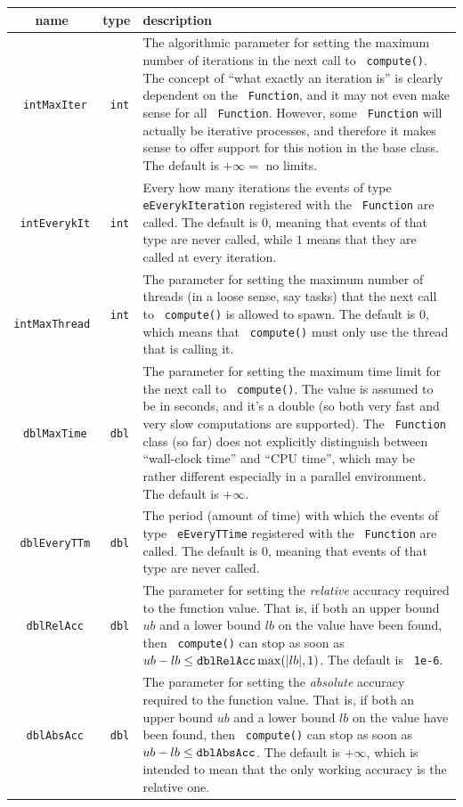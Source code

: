 \documentclass[a4paper]{article}
\newcommand{\code}[1]{\textrm{\texttt{\hyphenchar\font=200 #1}}}
\begin{document}
\begin{longtable}{|c|c|p{13.4cm}|}
 \hline
 name & type & description \\
 \hline
 \code{intMaxIter} & \code{int} & The algorithmic parameter for setting the maximum number of iterations in the next call to \code{compute()}. The concept of ``what exactly an iteration is'' is clearly dependent on the \code{Function}, and it may not even make sense for all \code{Function}. However, some \code{Function} will actually be iterative processes, and therefore it makes sense to offer support for this notion in the base class. The default is $+\infty =$ no limits.\\
 \hline
 \code{intEverykIt} & \code{int} & Every how many iterations the events of type \code{eEverykIteration} registered with the \code{Function} are called. The default is $0$, meaning that events of that type are never called, while $1$ means that they are called at every iteration.\\
 \hline
 \code{intMaxThread} & \code{int} & The parameter for setting the maximum number of threads (in a loose sense, say tasks) that the next call to \code{compute()} is allowed to spawn. The default is $0$, which means that \code{compute()} must only use the thread that is calling it.\\
 \hline
 \code{dblMaxTime} & \code{dbl} & The parameter for setting the maximum time limit for the next call to \code{compute()}. The value is assumed to be in seconds, and it's a double (so both very fast and very slow computations are supported). The \code{Function} class (so far) does not explicitly distinguish between ``wall-clock time'' and ``CPU time'', which may be rather different especially in a parallel environment. The default is $+\infty$.\\
 \hline
 \code{dblEveryTTm} & \code{dbl} & The period (amount of time) with which the events of type \code{eEveryTTime} registered with the \code{Function} are called. The default is $0$, meaning that events of that type are never called.\\
 \hline
 \code{dblRelAcc} & \code{dbl} & The parameter for setting the \emph{relative} accuracy required to the function value. That is, if both an upper bound $ub$ and a lower bound $lb$ on the value have been found, then \code{compute()} can stop as soon as $ub - lb \leq \code{dblRelAcc} \max( |lb| , 1 )$. The default is \code{1e-6}.\\
 \hline
 \code{dblAbsAcc} & \code{dbl} & The parameter for setting the \emph{absolute} accuracy required to the function value. That is, if both an upper bound $ub$ and a lower bound $lb$ on the value have been found, then \code{compute()} can stop as soon as $ub - lb \leq \code{dblAbsAcc}$. The default is $+\infty$, which is intended to mean that the only working accuracy is the relative one.\\

\end{longtable}
\end{document}
